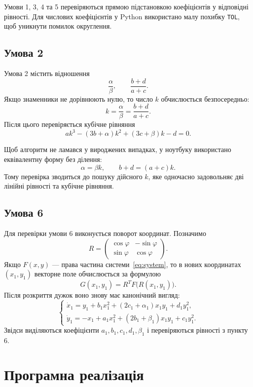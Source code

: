 \documentclass[12pt,a4paper]{article}
\begin{document}
Умови 1, 3, 4 та 5 перевіряються прямою підстановкою коефіцієнтів у відповідні рівності. Для числових коефіцієнтів у Python використано малу похибку \texttt{TOL}, щоб уникнути помилок округлення.

\subsection{Умова 2}

Умова 2 містить відношення
\[
\frac{\alpha}{\beta},\qquad \frac{b+d}{a+c}.
\]
Якщо знаменники не дорівнюють нулю, то число $k$ обчислюється безпосередньо:
\[
k=\frac{\alpha}{\beta}=\frac{b+d}{a+c}.
\]
Після цього перевіряється кубічне рівняння
\[
ak^3-(3b+\alpha)k^2+(3c+\beta)k-d=0.
\]

Щоб алгоритм не ламався у вироджених випадках, у ноутбуку використано еквівалентну форму без ділення:
\begin{equation*}
\alpha=\beta k,\qquad b+d=(a+c)k.
\end{equation*}
Тому перевірка зводиться до пошуку дійсного $k$, яке одночасно задовольняє дві лінійні рівності та кубічне рівняння.

\subsection{Умова 6}

Для перевірки умови 6 виконується поворот координат. Позначимо
\[
R=
\begin{pmatrix}
\cos\varphi & -\sin\varphi\\
\sin\varphi & \cos\varphi
\end{pmatrix}.
\]
Якщо $F(x,y)$ --- права частина системи~\eqref{eq:system}, то в нових координатах $(x_1,y_1)$ векторне поле обчислюється за формулою
\[
G(x_1,y_1)=R^T F\bigl(R(x_1,y_1)\bigr).
\]
Після розкриття дужок воно знову має канонічний вигляд:
\begin{equation*}
\begin{cases}
\dot{x}_1=y_1+b_1x_1^2+(2c_1+\alpha_1)x_1y_1+d_1y_1^2,\\
\dot{y}_1=-x_1+a_1x_1^2+(2b_1+\beta_1)x_1y_1+c_1y_1^2.
\end{cases}
\end{equation*}
Звідси виділяються коефіцієнти $a_1,b_1,c_1,d_1,\beta_1$ і перевіряються рівності з пункту 6.

\section{Програмна реалізація}
\end{document}
